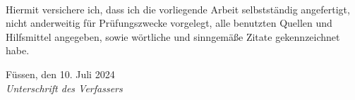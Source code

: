 \newpage
\thispagestyle{empty}


\\ 

\vspace*{2cm}

\noindent
Hiermit versichere ich, dass ich die vorliegende Arbeit selbstständig angefertigt, 
nicht anderweitig für Prüfungszwecke vorgelegt, alle benutzten
Quellen und Hilfsmittel angegeben, sowie wörtliche und sinngemäße Zitate gekennzeichnet habe.
\vspace{2cm}

\noindent
Füssen, den 10. Juli 2024
\hspace*{2cm}%
\dotfill\\
\hspace*{8.5cm}%
\textit{Unterschrift des Verfassers}





